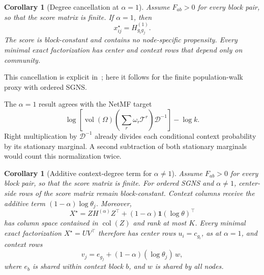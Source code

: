 \documentclass[aps,pre,reprint,superscriptaddress,longbibliography]{revtex4-2}
\newcommand{\ones}{\mathbf{1}}
\DeclareMathOperator{\vol}{vol}
\DeclareMathOperator{\col}{col}
\newtheorem{corollary}[theorem]{Corollary}
\begin{document}
\begin{corollary}[Degree cancellation at \(\alpha=1\)]
\label{cor:alpha-one}
Assume \(F_{ab}>0\) for every block pair, so that the score matrix is finite.
If \(\alpha=1\), then
\begin{equation}
    x^\star_{ij}=H^{(1)}_{g_i g_j}.
    \label{eq:alpha-one-score}
\end{equation}
The score is block-constant and contains no node-specific propensity.
Every minimal exact factorization has center and context rows that depend only on community.
\end{corollary}

This cancellation is explicit in~\citet[Lemma~S9]{davison2024community}; here it follows for the finite population-walk proxy with ordered SGNS.

The \(\alpha=1\) result agrees with the NetMF target~\citep{qiu2018network}
\begin{equation}
    \log\left[
        \vol(\Omega)
        \left(\sum_r \omega_r\mathcal{T}^r\right)
        \mathcal{D}^{-1}
    \right]
    -\log k.
    \label{eq:netmf}
\end{equation}
Right multiplication by \(\mathcal{D}^{-1}\) already divides each conditional context probability by its stationary marginal.
A second subtraction of both stationary marginals would count this normalization twice.

\begin{corollary}[Additive context-degree term for \(\alpha\neq 1\)]
\label{cor:alpha-not-one}
Assume \(F_{ab}>0\) for every block pair, so that the score matrix is finite.
For ordered SGNS and \(\alpha\neq 1\), center-side rows of the score matrix remain block-constant.
Context columns receive the additive term \((1-\alpha)\log\theta_j\).
Moreover,
\begin{equation}
    X^\star
    =
    ZH^{(\alpha)}Z^\top
    +(1-\alpha)\ones(\log\theta)^\top
    \label{eq:sgns-score-matrix}
\end{equation}
has column space contained in \(\col(Z)\) and rank at most \(K\).
Every minimal exact factorization \(X^\star=UV^\top\) therefore has center rows \(u_i=c_{g_i}\), as at \(\alpha=1\), and context rows
\begin{equation}
    v_j=e_{g_j}+(1-\alpha)(\log\theta_j)\,w,
    \label{eq:sgns-context-rows}
\end{equation}
where \(e_b\) is shared within context block \(b\), and \(w\) is shared by all nodes.
\end{corollary}
\end{document}
